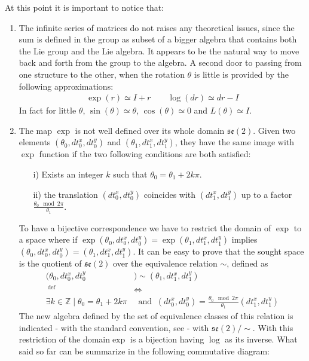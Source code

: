 At this point it is important to notice that: 
\begin{enumerate}
	\item The infinite series of matrices  do not raises any theoretical issues, since the sum is defined in the group as subset of a bigger algebra that contains both the Lie group and the Lie algebra. It appears to be the natural way to move back and forth from the group to the algebra. A second door to passing from one structure to the other, when the rotation $\theta$ is little is provided by the following approximations:
	\begin{align*}
	\exp(r) \simeq I + r
	\qquad 
	\log(dr) \simeq dr - I
	\end{align*}
	In fact for little $\theta$, $\sin(\theta) \simeq \theta$, $\cos(\theta) \simeq 0 $ and $ L(\theta) \simeq I$.
	\item The map $\exp$ is not well defined over its whole domain $\mathfrak{se}(2)$. Given two elements $(\theta_0, dt^{x}_0, dt^{y}_0)$ and $(\theta_1, dt^{x}_1, dt^{y}_1)$, they have the same image with $\exp$ function if the two following conditions are both satisfied:
	\begin{enumerate}
		\item[i)] Exists an integer $k$ such that $\theta_0 = \theta_1 + 2k\pi$.
		\item[ii)] the translation $(dt^{x}_0, dt^{y}_0)$ coincides with $(dt^{x}_1, dt^{y}_1)$ up to a factor $\frac{\theta_0 \mod 2\pi}{\theta_1}$.
	\end{enumerate}
	To have a bijective correspondence we have to restrict the domain of $\exp$ to a space where if $\exp(\theta_0, dt^{x}_0,dt^{y}_0) = \exp(\theta_1, dt^{x}_1, dt^{y}_1)$ implies  $(\theta_0, dt^{x}_0, dt^{y}_0) = (\theta_1, dt^{x}_1, dt^{y}_1)$.
	It can be easy to prove that the sought space is the quotient of $\mathfrak{se}(2)$ over the equivalence relation $\sim$, defined as 
	\begin{align*}
		(\theta_0, dt^{x}_0, dt^{y}_0 & ) \sim (\theta_1, dt^{x}_1, dt^{y}_1)
		\\
		~^{\text{def}}&\iff
		\\
		\exists k\in\mathbb{Z} \mid \theta_0 = \theta_1 + 2k\pi 
		&~\text{ and }~
		(dt^{x}_0, dt^{y}_0) = \frac{\theta_0 \mod 2\pi}{\theta_1}(dt^{x}_1, dt^{y}_1)
	\end{align*}
	The new algebra defined by the set of equivalence classes of this relation is indicated - with the standard convention, see \cite{artin2011algebra} - with $\mathfrak{se}(2)/\sim$. With this restriction of the domain$\exp$ is a bijection having $\log$ as its inverse.
	What said so far can be summarize in the following commutative diagram:
	

\end{enumerate}
